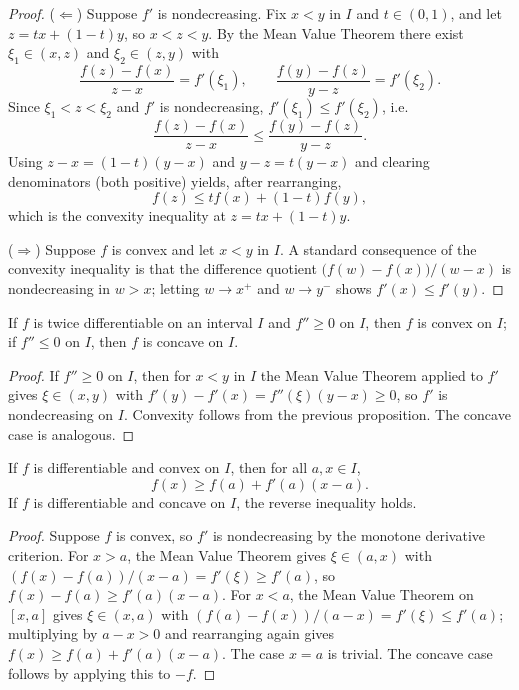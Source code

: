 \documentclass{essay}
\begin{document}
\begin{proof}
(\(\Leftarrow\)) Suppose \(f'\) is nondecreasing. Fix \(x<y\) in \(I\) and
\(t\in(0,1)\), and let \(z=tx+(1-t)y\), so \(x<z<y\). By the Mean Value
Theorem there exist \(\xi_1\in(x,z)\) and \(\xi_2\in(z,y)\) with
\[
\frac{f(z)-f(x)}{z-x}=f'(\xi_1), \qquad \frac{f(y)-f(z)}{y-z}=f'(\xi_2).
\]
Since \(\xi_1<z<\xi_2\) and \(f'\) is nondecreasing, \(f'(\xi_1)\leq
f'(\xi_2)\), i.e.
\[
\frac{f(z)-f(x)}{z-x}\leq\frac{f(y)-f(z)}{y-z}.
\]
Using \(z-x=(1-t)(y-x)\) and \(y-z=t(y-x)\) and clearing denominators
(both positive) yields, after rearranging,
\[
f(z)\leq t f(x)+(1-t)f(y),
\]
which is the convexity inequality at \(z=tx+(1-t)y\).

(\(\Rightarrow\)) Suppose \(f\) is convex and let \(x<y\) in \(I\). A
standard consequence of the convexity inequality is that the difference
quotient \(\bigl(f(w)-f(x)\bigr)/(w-x)\) is nondecreasing in \(w>x\); letting
\(w\to x^+\) and \(w\to y^-\) shows \(f'(x)\leq f'(y)\).
\end{proof}

\begin{proposition}
If \(f\) is twice differentiable on an interval \(I\) and \(f''\geq0\) on
\(I\), then \(f\) is convex on \(I\); if \(f''\leq0\) on \(I\), then \(f\)
is concave on \(I\).
\end{proposition}

\begin{proof}
If \(f''\geq0\) on \(I\), then for \(x<y\) in \(I\) the Mean Value Theorem
applied to \(f'\) gives \(\xi\in(x,y)\) with \(f'(y)-f'(x)=f''(\xi)(y-x)\geq
0\), so \(f'\) is nondecreasing on \(I\). Convexity follows from the
previous proposition. The concave case is analogous.
\end{proof}

\begin{proposition}
If \(f\) is differentiable and convex on \(I\), then for all \(a,x\in I\),
\[
f(x)\geq f(a)+f'(a)(x-a).
\]
If \(f\) is differentiable and concave on \(I\), the reverse inequality
holds.
\end{proposition}

\begin{proof}
Suppose \(f\) is convex, so \(f'\) is nondecreasing by the monotone
derivative criterion. For \(x>a\), the Mean Value Theorem gives \(\xi\in
(a,x)\) with \((f(x)-f(a))/(x-a)=f'(\xi)\geq f'(a)\), so \(f(x)-f(a)\geq
f'(a)(x-a)\). For \(x<a\), the Mean Value Theorem on \([x,a]\) gives
\(\xi\in(x,a)\) with \((f(a)-f(x))/(a-x)=f'(\xi)\leq f'(a)\); multiplying by
\(a-x>0\) and rearranging again gives \(f(x)\geq f(a)+f'(a)(x-a)\). The case
\(x=a\) is trivial. The concave case follows by applying this to \(-f\).
\end{proof}
\end{document}
